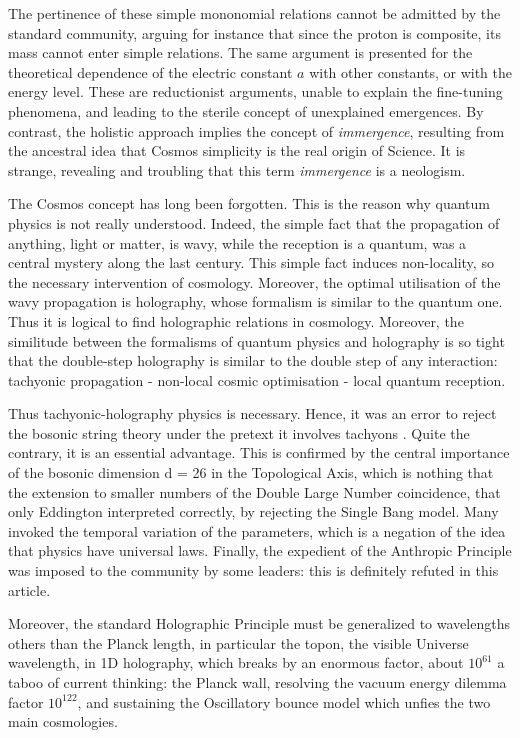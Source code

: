 \documentclass[twoside,draft]{article}
\begin{document}
\begin{sloppypar}
The pertinence of these simple mononomial relations cannot be admitted by the standard community, arguing for instance that since the proton is composite, its mass cannot enter simple relations. The same argument is presented for the theoretical dependence of the electric constant $a$ with other constants, or with the energy level. These are reductionist arguments, unable to explain the fine-tuning phenomena, and leading to the sterile concept of unexplained emergences. By contrast, the holistic approach implies the concept of \textit{immergence}, resulting from the ancestral idea that Cosmos simplicity is the real origin of Science. It is strange, revealing and troubling that this term \textit{immergence} is a neologism.

The Cosmos concept has long been forgotten. This is the reason why quantum physics is not really understood. Indeed, the simple fact that the propagation of anything, light or matter, is wavy, while the reception is a quantum, was a central mystery along the last century. This simple fact induces non-locality, so the necessary intervention of cosmology. Moreover, the optimal utilisation of the wavy propagation is holography, whose formalism is similar to the quantum one. Thus it is logical to find holographic relations in cosmology. Moreover, the similitude between the formalisms of quantum physics and holography is so tight that the double-step holography is similar to the double step of any interaction: tachyonic propagation - non-local cosmic optimisation - local quantum reception.

Thus tachyonic-holography physics is necessary. Hence, it was an error to reject the bosonic string theory under the pretext it involves tachyons \cite{Woigt}. Quite the contrary, it is an essential advantage. This is confirmed by the central importance of the bosonic dimension d = 26 in the Topological Axis, which is nothing that the extension to smaller numbers of the Double Large Number coincidence, that only Eddington interpreted correctly, by rejecting the Single Bang model. Many invoked the temporal variation of the parameters, which is a negation of the idea that physics have universal laws. Finally, the expedient of the Anthropic Principle was imposed to the community by some leaders: this is definitely refuted in this article.

Moreover, the standard Holographic Principle must be generalized to wavelengths others than the Planck
length, in particular the topon, the visible Universe wavelength, in 1D holography, which breaks by an enormous factor, about $10^{61}$ a taboo of current thinking: the Planck wall, resolving the vacuum energy dilemma factor $10^{122}$, and sustaining the Oscillatory bounce model which unfies the two main cosmologies.


\end{sloppypar}
\end{document}

